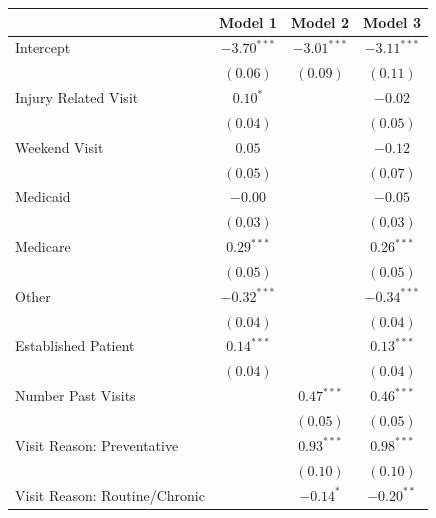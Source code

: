 \documentclass[12pt,twoside]{reedthesis}
\begin{document}
  \begin{table}
  \begin{center}
  \begin{small}
  \begin{tabular}{l c c c }
  \hline
   & Model 1 & Model 2 & Model 3 \\
  \hline
  Intercept                     & $-3.70^{***}$ & $-3.01^{***}$ & $-3.11^{***}$ \\
                                & $(0.06)$      & $(0.09)$      & $(0.11)$      \\
  Injury Related Visit          & $0.10^{*}$    &               & $-0.02$       \\
                                & $(0.04)$      &               & $(0.05)$      \\
  Weekend Visit                 & $0.05$        &               & $-0.12$       \\
                                & $(0.05)$      &               & $(0.07)$      \\
  Medicaid                      & $-0.00$       &               & $-0.05$       \\
                                & $(0.03)$      &               & $(0.03)$      \\
  Medicare                      & $0.29^{***}$  &               & $0.26^{***}$  \\
                                & $(0.05)$      &               & $(0.05)$      \\
  Other                         & $-0.32^{***}$ &               & $-0.34^{***}$ \\
                                & $(0.04)$      &               & $(0.04)$      \\
  Established Patient           & $0.14^{***}$  &               & $0.13^{***}$  \\
                                & $(0.04)$      &               & $(0.04)$      \\
  Number Past Visits            &               & $0.47^{***}$  & $0.46^{***}$  \\
                                &               & $(0.05)$      & $(0.05)$      \\
  Visit Reason: Preventative    &               & $0.93^{***}$  & $0.98^{***}$  \\
                                &               & $(0.10)$      & $(0.10)$      \\
  Visit Reason: Routine/Chronic &               & $-0.14^{*}$   & $-0.20^{**}$  \\

\end{tabular}
\end{small}
\end{center}
\end{table}
\end{document}
